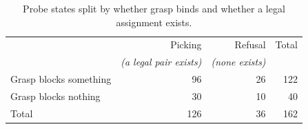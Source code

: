 \begin{table}[H]
\centering
\caption{Probe states split by whether grasp binds and whether a legal
assignment exists.}
\label{tab:ex1:subsets}
\begin{tabular}{lrrr}
\toprule
& Picking & Refusal & Total \\
& \emph{(a legal pair exists)} & \emph{(none exists)} & \\
\midrule
Grasp blocks something   &  96 & 26 & 122 \\
Grasp blocks nothing     &  30 & 10 & 40 \\
\midrule
Total                    & 126 & 36 & 162 \\
\bottomrule
\end{tabular}
\end{table}

